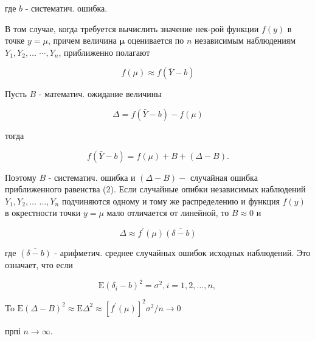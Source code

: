 \documentclass[10pt]{article}
\begin{document}
где $b$ - систематич. ошибка.



В том случае, когда требуется вычислить значение нек-рой функции $f(y)$ в точке $y=\mu$, причем величина $\boldsymbol{\mu}$ оценивается по $n$ независимым наблюдениям $Y_{1}, Y_{2}, \ldots$ $\cdots, Y_{n}$, приближенно полагают



\[

f(\mu) \approx f(\bar{Y}-b)

\]



Пусть $B$ - математич. ожидание величины



\[

\Delta=f(\bar{Y}-b)-f(\mu)

\]



тогда



\[

f(\bar{Y}-b)=f(\mu)+B+(\Delta-B) .

\]



Поэтому $B$ - систематич. ошибка и $(\Delta-B)-$ случайная ошибка приближенного равенства (2). Если случайные опибки независимых наблюдений $Y_{1}, Y_{2}, \ldots$ $\ldots, Y_{n}$ подчиняются одному и тому же распределению и функция $f(y)$ в окрестности точки $y=\mu$ мало отличается от линейной, то $B \approx 0$ и



\[

\Delta \approx f^{\prime}(\mu) \overline{(\delta-b)}

\]



где $\overline{(\delta-b)}$ - арифметич. среднее случайных ошибок исходных наблюдений. Это означает, что если



\[

\mathrm{E}\left(\delta_{i}-b\right)^{2}=\sigma^{2}, i=1,2, \ldots, n \text {, }

\]



To $\mathrm{E}(\Delta-B)^{2} \approx \mathrm{E} \Delta^{2} \approx\left[f^{\prime}(\mu)\right]^{2} \sigma^{2} / n \rightarrow 0$



прпі $n \rightarrow \infty$.
\end{document}
